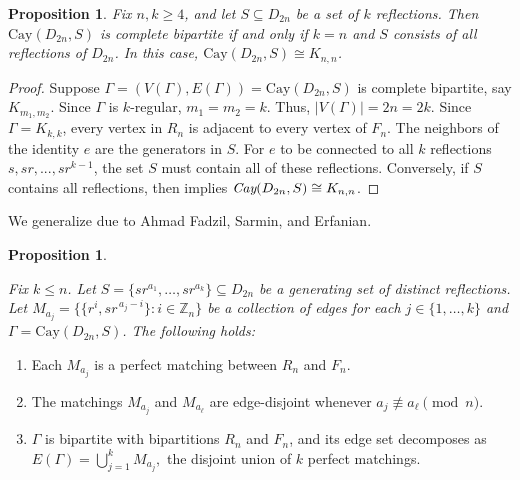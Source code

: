 \documentclass[12pt,reqno,a4paper]{amsart}
\theoremstyle{definition}
\newtheorem{prop}[defn]{Proposition}
\begin{document}
\begin{prop}\label{Proposition 4.1}
{\em
Fix $n,k\ge 4$, and let $S\subseteq D_{2n}$ be a set of $k$ reflections.  
Then $\mathrm{Cay}(D_{2n},S)$ is complete bipartite if and only if $k=n$ and $S$ consists of all reflections of $D_{2n}$.  
In this case, $\mathrm{Cay}(D_{2n},S)\cong K_{n,n}$.}
\end{prop}

\begin{proof}
Suppose $\Gamma=(V(\Gamma),E(\Gamma))=\text{Cay}(D_{2n}, S)$ is complete bipartite, say $K_{m_{1},m_{2}}$. Since $\Gamma$ is $k$-regular, $m_{1}=m_{2}=k$. Thus, $\vert V(\Gamma)\vert=2n=2k$. 
Since $\Gamma=K_{k,k}$, every vertex in $R_{n}$ is adjacent to every vertex of $F_{n}$. The neighbors of the identity $e$ are the generators in $S$. For $e$ to be connected to all $k$ reflections $s,sr,...,sr^{k-1}$, the set $S$ must contain all of these reflections.
Conversely, if $S$ contains all reflections, then \cite[Proposition 2]{ASE2019}
implies $\text{\em Cay}(D_{2n},S)\cong K_{n,n}$.
 \end{proof}
We generalize \cite[Proposition 2]{ASE2019} due to Ahmad Fadzil, Sarmin, and Erfanian.
\begin{prop}\label{Proposition 4.2}
{\em Fix $k\leq n$. Let \(S=\{sr^{a_{1}},\dots ,sr^{a_{k}}\}\subseteq D_{2n}\) be a generating set of distinct reflections. Let \(M_{a_{j}}=\bigl\{\{r^{i},sr^{\,a_{j}-i}\}:i\in \mathbb{Z}_{n}\bigr\}\) be a collection of edges for each \(j\in \{1,\dots ,k\}\) and \(\Gamma =\mathrm{Cay}(D_{2n},S)\). The following holds:
\begin{enumerate}
\item Each \(M_{a_{j}}\) is a perfect matching between $R_{n}$ and $F_{n}$.
\item The matchings $M_{a_j}$ and $M_{a_\ell}$ are edge-disjoint whenever $a_j\not\equiv a_\ell\pmod n$.

\item $\Gamma$ is bipartite with bipartitions $R_{n}$ and $F_{n}$, and its edge set decomposes as 
$
E(\Gamma) = \bigcup_{j=1}^{k} M_{a_j},
$
the disjoint union of $k$ perfect matchings.
\end{enumerate}    
}
\end{prop}
\end{document}
